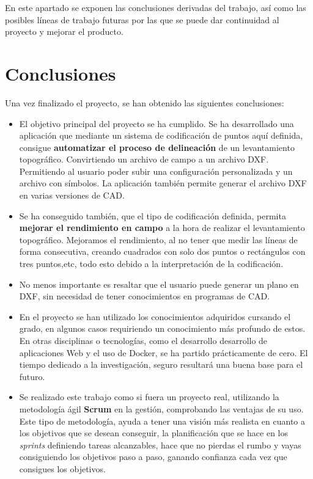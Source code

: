 
En este apartado se exponen las conclusiones derivadas del trabajo, así como
las posibles líneas de trabajo futuras por las que se puede dar continuidad al
proyecto y mejorar el producto.

\section{Conclusiones}

Una vez finalizado el proyecto, se han obtenido las siguientes conclusiones:

\begin{itemize}
\item El objetivo principal del proyecto se ha cumplido. Se ha desarrollado una aplicación que mediante un sistema de codificación de puntos aquí definida, consigue \textbf{automatizar el proceso de delineación} de un levantamiento topográfico. Convirtiendo un archivo de campo a un archivo DXF. Permitiendo al usuario poder subir una configuración personalizada y un archivo con símbolos. La aplicación también permite generar el archivo DXF en varias versiones de CAD. 

\item Se ha conseguido también, que el tipo de codificación definida, permita \textbf{mejorar el rendimiento en campo} a la hora de realizar el levantamiento topográfico. Mejoramos el rendimiento, al no tener que medir las líneas de forma consecutiva, creando cuadrados con solo dos puntos o rectángulos con tres puntos,etc, todo esto debido a la interpretación de la codificación.

\item No menos importante es resaltar que el usuario puede generar un plano en DXF, sin necesidad de tener conocimientos en programas de CAD.

\item En el proyecto se han utilizado los conocimientos adquiridos cursando el grado, en algunos casos requiriendo un conocimiento más profundo de estos. En otras disciplinas o tecnologías, como el desarrollo desarrollo de aplicaciones Web y el uso de Docker, se ha partido prácticamente de cero.
El tiempo dedicado a la investigación, seguro resultará una buena base para el futuro.

\item Se realizado este trabajo como si fuera un proyecto real,
utilizando la  metodología ágil \textbf{Scrum} en la gestión, comprobando las ventajas de su uso. Este tipo de metodología, ayuda a tener una visión más realista en cuanto a los objetivos que se desean conseguir, la planificación que se hace en los \emph{sprints} definiendo tareas alcanzables, hace que no pierdas el rumbo y vayas consiguiendo los objetivos paso a paso, ganando confianza cada vez que consigues los objetivos. 
\end{itemize}

